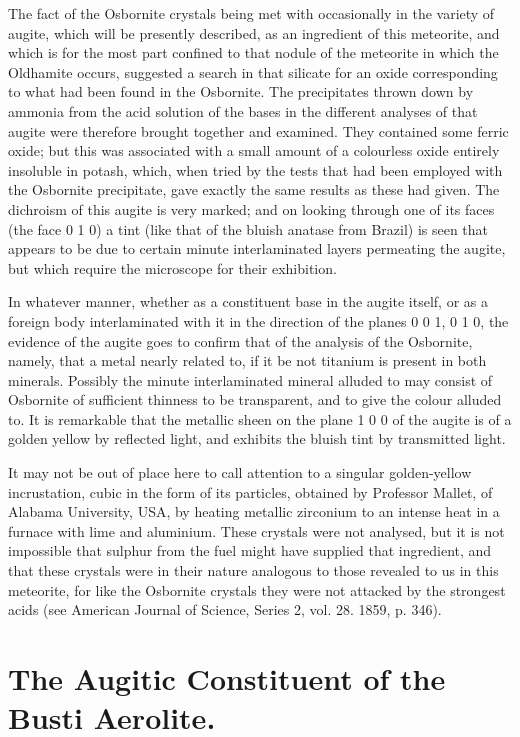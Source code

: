 \documentclass[a4paper, 12pt, oneside]{article}
\begin{document}
The fact of the Osbornite crystals being met with occasionally in the variety of augite, which will be presently described, as an ingredient of this meteorite, and which is for the most part confined to that nodule of the meteorite in which the Oldhamite occurs, suggested a search in that silicate for an oxide corresponding to what had been found in the Osbornite. The precipitates thrown down by ammonia from the acid solution of the bases in the different analyses of that augite were therefore brought together and examined. They contained some ferric oxide; but this was associated with a small amount of a colourless oxide entirely insoluble in potash, which, when tried by the tests that had been employed with the Osbornite precipitate, gave exactly the same results as these had given. The dichroism of this augite is very marked; and on looking through one of its faces (the face 0 1 0) a tint (like that of the bluish anatase from Brazil) is seen that appears to be due to certain minute interlaminated layers permeating the augite, but which require the microscope for their exhibition.

In whatever manner, whether as a constituent base in the augite itself, or as a foreign body interlaminated with it in the direction of the planes 0 0 1, 0 1 0, the evidence of the augite goes to confirm that of the analysis of the Osbornite, namely, that a metal nearly related to, if it be not titanium is present in both minerals. Possibly the minute interlaminated mineral alluded to may consist of Osbornite of sufficient thinness to be transparent, and to give the colour alluded to. It is remarkable that the metallic sheen on the plane 1 0 0 of the augite is of a golden yellow by reflected light, and exhibits the bluish tint by transmitted light.

It may not be out of place here to call attention to a singular golden-yellow incrustation, cubic in the form of its particles, obtained by Professor Mallet, of Alabama University, USA, by heating metallic zirconium to an intense heat in a furnace with lime and aluminium. These crystals were not analysed, but it is not impossible that sulphur from the fuel might have supplied that ingredient, and that these crystals were in their nature analogous to those revealed to us in this meteorite, for like the Osbornite crystals they were not attacked by the strongest acids (see American Journal of Science, Series 2, vol. 28. 1859, p. 346).
\clearpage
\section{The Augitic Constituent of the Busti Aerolite.}
\end{document}
